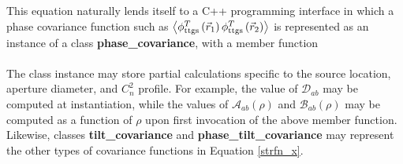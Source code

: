 This equation naturally lends itself to a C++ programming interface in
which a phase covariance function such as $\left\langle\phi^{T}_{\rm
  ttgs}\left(\vec{r}_{1}\right) \phi^{T}_{\rm
  ttgs}\left(\vec{r}_{2}\right)\right\rangle$ is represented as
an instance of a class {\bf phase\_covariance}, with a member function
\\ 
\\
The class instance may store partial calculations specific to the
source location, aperture diameter, and $C_{n}^{2}$ profile.  For
example, the value of $\mathcal{D}_{ab}$ may be computed at
instantiation, while the values of $\mathcal{A}_{ab}\left(\rho\right)$
and $\mathcal{B}_{ab}\left(\rho\right)$ may be computed as a function
of $\rho$ upon first invocation of the above member function.
Likewise, classes {\bf tilt\_covariance} and {\bf phase\_tilt\_covariance}
may represent the other types of covariance functions in Equation
\ref{strfn_x}.  
















